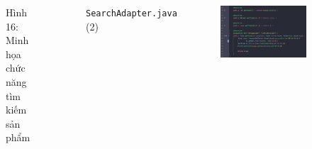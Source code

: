 \documentclass{beamer}
\begin{document}
\begin{frame}
\begin{columns}
\begin{figure}
            \caption{\centering\tiny{Hình 16: Minh họa chức năng tìm kiếm sản phẩm}}
        \end{figure}
        \indent \texttt{SearchAdapter.java} (2)
        \begin{figure}
            \centering
            \includegraphics[width=\textwidth]{images/49.png}
        \end{figure}
    \end{columns}
\end{frame}
\end{document}
